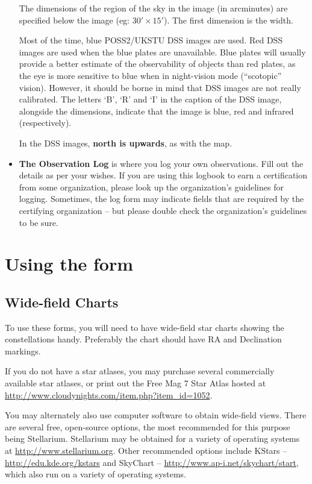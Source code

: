 \begin{itemize}
  The dimensions of the region of the sky in the image (in arcminutes)
  are specified below the image (eg: $30' \times 15'$). The first
  dimension is the width.

  Most of the time, blue POSS2/UKSTU DSS images are used. Red DSS
  images are used when the blue plates are unavailable. Blue plates
  will usually provide a better estimate of the observability of
  objects than red plates, as the eye is more sensitive to blue when
  in night-vision mode (``scotopic'' vision). However, it should be
  borne in mind that DSS images are not really calibrated. The letters
  `B', `R' and `I' in the caption of the DSS image, alongside the
  dimensions, indicate that the image is blue, red and infrared
  (respectively).

  In the DSS images, \textbf{north is upwards}, as with the map.

\item \textbf{The Observation Log} is where you log your own
  observations. Fill out the details as per your wishes. If you are
  using this logbook to earn a certification from some organization,
  please look up the organization's guidelines for logging. Sometimes,
  the log form may indicate fields that are required by the certifying
  organization -- but please double check the organization's
  guidelines to be sure.

\end{itemize}

\section{Using the form}

\subsection{Wide-field Charts}
To use these forms, you will need to have wide-field star charts
showing the constellations handy. Preferably the chart should have RA
and Declination markings.

If you do not have a star atlases, you may purchase several
commercially available star atlases, or print out the Free Mag 7 Star
Atlas hosted at
\url{http://www.cloudynights.com/item.php?item_id=1052}.

You may alternately also use computer software to obtain wide-field
views. There are several free, open-source options, the most
recommended for this purpose being Stellarium. Stellarium may be
obtained for a variety of operating systems at
\url{http://www.stellarium.org}. Other recommended options include
KStars -- \url{http://edu.kde.org/kstars} and SkyChart --
\url{http://www.ap-i.net/skychart/start}, which also run on a variety
of operating systems.

